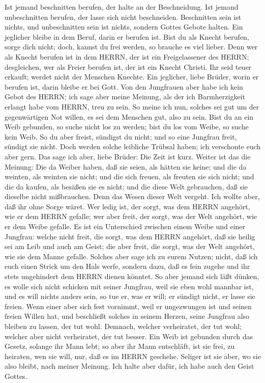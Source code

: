  Ist jemand beschnitten berufen, der halte an der
Beschneidung. Ist jemand unbeschnitten berufen, der lasse sich nicht
beschneiden.  Beschnitten sein ist nichts, und
unbeschnitten sein ist nichts, sondern Gottes Gebote halten.
 Ein jeglicher bleibe in dem Beruf, darin er berufen ist.
 Bist du als Knecht berufen, sorge dich nicht; doch, kannst
du frei werden, so brauche es viel lieber.  Denn wer als
Knecht berufen ist in dem HERRN, der ist ein Freigelassener des HERRN;
desgleichen, wer als Freier berufen ist, der ist ein Knecht Christi.
 Ihr seid teuer erkauft; werdet nicht der Menschen Knechte.
 Ein jeglicher, liebe Brüder, worin er berufen ist, darin
bleibe er bei Gott.  Von den Jungfrauen aber habe ich kein
Gebot des HERRN; ich sage aber meine Meinung, als der ich Barmherzigkeit
erlangt habe vom HERRN, treu zu sein.  So meine ich nun,
solches sei gut um der gegenwärtigen Not willen, es sei dem Menschen
gut, also zu sein.  Bist du an ein Weib gebunden, so suche
nicht los zu werden; bist du los vom Weibe, so suche kein Weib.
 So du aber freist, sündigst du nicht; und so eine Jungfrau
freit, sündigt sie nicht. Doch werden solche leibliche Trübsal haben;
ich verschonte euch aber gern.  Das sage ich aber, liebe
Brüder: Die Zeit ist kurz. Weiter ist das die Meinung: Die da Weiber
haben, daß sie seien, als hätten sie keine; und die da weinten, als
weinten sie nicht;  und die sich freuen, als freuten sie
sich nicht; und die da kaufen, als besäßen sie es nicht; 
und die diese Welt gebrauchen, daß sie dieselbe nicht mißbrauchen. Denn
das Wesen dieser Welt vergeht.  Ich wollte aber, daß ihr
ohne Sorge wäret. Wer ledig ist, der sorgt, was dem HERRN angehört, wie
er dem HERRN gefalle;  wer aber freit, der sorgt, was der
Welt angehört, wie er dem Weibe gefalle. Es ist ein Unterschied zwischen
einem Weibe und einer Jungfrau:  welche nicht freit, die
sorgt, was dem HERRN angehört, daß sie heilig sei am Leib und auch am
Geist; die aber freit, die sorgt, was der Welt angehört, wie sie dem
Manne gefalle.  Solches aber sage ich zu eurem Nutzen;
nicht, daß ich euch einen Strick um den Hals werfe, sondern dazu, daß es
fein zugehe und ihr stets ungehindert dem HERRN dienen könntet.
 So aber jemand sich läßt dünken, es wolle sich nicht
schicken mit seiner Jungfrau, weil sie eben wohl mannbar ist, und es
will nichts anders sein, so tue er, was er will; er sündigt nicht, er
lasse sie freien.  Wenn einer aber sich fest vornimmt, weil
er ungezwungen ist und seinen freien Willen hat, und beschließt solches
in seinem Herzen, seine Jungfrau also bleiben zu lassen, der tut wohl.
 Demnach, welcher verheiratet, der tut wohl; welcher aber
nicht verheiratet, der tut besser.  Ein Weib ist gebunden
durch das Gesetz, solange ihr Mann lebt; so aber ihr Mann entschläft,
ist sie frei, zu heiraten, wen sie will, nur, daß es im HERRN geschehe.
 Seliger ist sie aber, wo sie also bleibt, nach meiner
Meinung. Ich halte aber dafür, ich habe auch den Geist Gottes.

